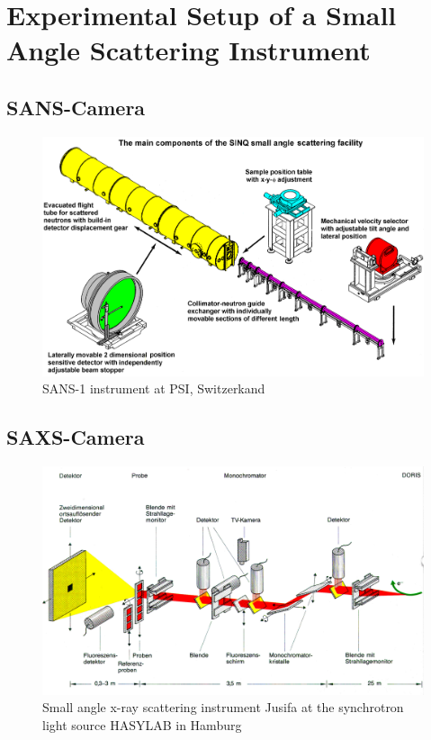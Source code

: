 \chapter{Experimental Setup of a Small Angle Scattering Instrument}
\section{SANS-Camera}
\begin{figure}[htb]
\begin{center}
\includegraphics[width=\textwidth,height=0.627\textwidth]{SANSAN.png}
\caption{SANS-1 instrument at PSI, Switzerkand} \label{SANS1@PSI}
\end{center}
\end{figure}

\section{SAXS-Camera}

\begin{figure}[htb]
\begin{center}
\includegraphics[width=\textwidth,height=0.598\textwidth]{CJUSIFA.png}
\caption{Small angle x-ray scattering instrument Jusifa at the
synchrotron light source HASYLAB in Hamburg} \label{Jusifa}
\end{center}
\end{figure}

